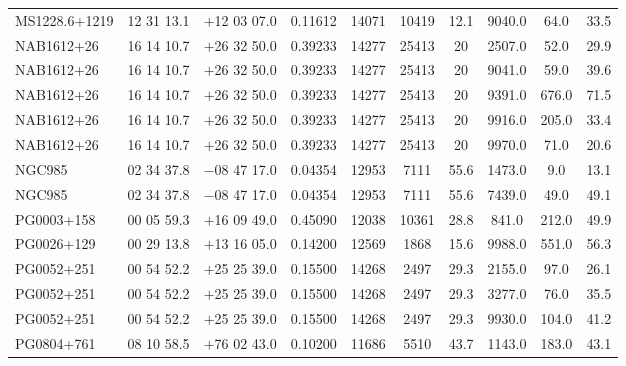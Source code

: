 \begin{landscape}
\begin{center}
\begin{longtable}{l c c c c c c c c c}
MS1228.6+1219  &           12 31 13.1  &         $+$12 03 07.0  &       0.11612  & 14071  &   10419  &      12.1  &      9040.0  &  64.0  &   33.5  \\
NAB1612+26  &              16 14 10.7  &         $+$26 32 50.0  &       0.39233  & 14277  &   25413  &      20  &        2507.0  &  52.0  &   29.9  \\
NAB1612+26  &              16 14 10.7  &         $+$26 32 50.0  &       0.39233  & 14277  &   25413  &      20  &        9041.0  &  59.0  &   39.6  \\
NAB1612+26  &              16 14 10.7  &         $+$26 32 50.0  &       0.39233  & 14277  &   25413  &      20  &        9391.0  &  676.0  &  71.5  \\
NAB1612+26  &              16 14 10.7  &         $+$26 32 50.0  &       0.39233  & 14277  &   25413  &      20  &        9916.0  &  205.0  &  33.4  \\
NAB1612+26  &              16 14 10.7  &         $+$26 32 50.0  &       0.39233  & 14277  &   25413  &      20  &        9970.0  &  71.0  &   20.6  \\
NGC985  &                  02 34 37.8  &         $-$08 47 17.0  &       0.04354  & 12953  &   7111  &       55.6  &      1473.0  &  9.0  &    13.1  \\
NGC985  &                  02 34 37.8  &         $-$08 47 17.0  &       0.04354  & 12953  &   7111  &       55.6  &      7439.0  &  49.0  &   49.1  \\
PG0003+158  &              00 05 59.3  &         $+$16 09 49.0  &       0.45090  & 12038  &   10361  &      28.8  &      841.0  &   212.0  &  49.9  \\
PG0026+129  &              00 29 13.8  &         $+$13 16 05.0  &       0.14200  & 12569  &   1868  &       15.6  &      9988.0  &  551.0  &  56.3  \\
PG0052+251  &              00 54 52.2  &         $+$25 25 39.0  &       0.15500  & 14268  &   2497  &       29.3  &      2155.0  &  97.0  &   26.1  \\
PG0052+251  &              00 54 52.2  &         $+$25 25 39.0  &       0.15500  & 14268  &   2497  &       29.3  &      3277.0  &  76.0  &   35.5  \\
PG0052+251  &              00 54 52.2  &         $+$25 25 39.0  &       0.15500  & 14268  &   2497  &       29.3  &      9930.0  &  104.0  &  41.2  \\
PG0804+761  &              08 10 58.5  &         $+$76 02 43.0  &       0.10200  & 11686  &   5510  &       43.7  &      1143.0  &  183.0  &  43.1  \\

\end{longtable}
\end{center}
\end{landscape}
